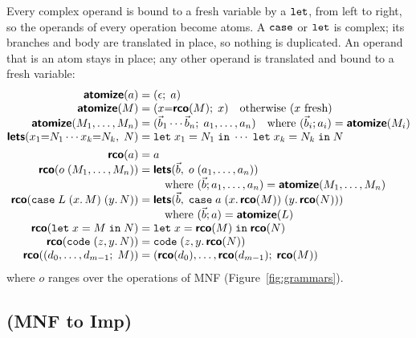 Every complex operand is bound to a fresh variable by a $\mathtt{let}$,
from left to right, so the operands of every operation become atoms. A
$\mathtt{case}$ or $\mathtt{let}$ is complex; its branches and body are
translated in place, so nothing is duplicated. An operand that is an
atom stays in place; any other operand is translated and bound to a
fresh variable:
\[
\begin{array}{@{}r@{\;}c@{\;}l@{}}
  \pass{atomize}(a) & = & (\epsilon;\; a)\\
  \pass{atomize}(M) & = & (x{=}\pass{rco}(M);\; x)
    \quad \text{otherwise } (x \text{ fresh})\\
  \pass{atomize}(M_1, \ldots, M_n) & = & (\vec{b}_1 \cdots \vec{b}_n;\; a_1, \ldots, a_n)
    \quad \text{where } (\vec{b}_i; a_i) = \pass{atomize}(M_i)\\
  \pass{lets}(x_1{=}N_1 \cdots x_k{=}N_k,\; N) & = &
    \kw{let}\;x_1 = N_1\;\kw{in}\;\cdots\;\kw{let}\;x_k = N_k\;\kw{in}\;N\\[4pt]
  \pass{rco}(a) & = & a\\
  \pass{rco}(o\;(M_1, \ldots, M_n)) & = & \pass{lets}(\vec{b},\; o\;(a_1, \ldots, a_n))\\
  & & \quad \text{where } (\vec{b}; a_1, \ldots, a_n) = \pass{atomize}(M_1, \ldots, M_n)\\
  \pass{rco}(\kw{case}\;L\;(x.\,M)\;(y.\,N)) & = &
    \pass{lets}(\vec{b},\; \kw{case}\;a\;(x.\,\pass{rco}(M))\;(y.\,\pass{rco}(N)))\\
  & & \quad \text{where } (\vec{b}; a) = \pass{atomize}(L)\\
  \pass{rco}(\kw{let}\;x = M\;\kw{in}\;N) & = & \kw{let}\;x = \pass{rco}(M)\;\kw{in}\;\pass{rco}(N)\\
  \pass{rco}(\kw{code}\;(z, y.\,N)) & = & \kw{code}\;(z, y.\,\pass{rco}(N))\\
  \pass{rco}((d_0, \ldots, d_{m-1};\; M)) & = & (\pass{rco}(d_0), \ldots, \pass{rco}(d_{m-1});\; \pass{rco}(M))
\end{array}
\]
where $o$ ranges over the operations of MNF (Figure~\ref{fig:grammars}).

\subsection{ (MNF to Imp)}
\label{app:pass-lift-locals}

